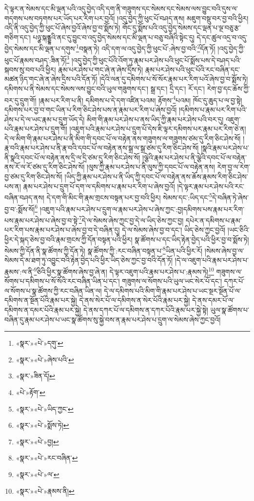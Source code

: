 དེ་ལྟར་ན་སེམས་དང་མི་ལྡན་པའི་འདུ་བྱེད་འདི་དག་ནི་གཟུགས་དང་སེམས་དང་སེམས་ལས་བྱུང་བའི་དུས་ལ་གདགས་པས་བཏགས་པར་ཡོད་པར་རིག་པར་བྱའོ། །འདུ་བྱེད་ཀྱི་ཕུང་པོ་བཤད་ནས། མཇུག་བསྡུ་བར་བྱ་བའི་ཕྱིར། འདི་ནི་འདུ་བྱེད་ཀྱི་ཕུང་པོ་ཞེས་བྱའོ་ཞེས་བྱ་བ་སྨོས་ཏེ། གོང་དུ་སྨོས་པའི་འདུ་བྱེད་སེམས་དང་ལྡན་པ་ལྔ་བཅུ་རྩ་གཅིག་དང་། པཉྩ་སྐནྡྷའི་ནང་དུ་བྱུང་བ་འདུ་བྱེད་སེམས་དང་མི་ལྡན་པ་བཅུ་བཞིའི་སྟེང་དུ། དེ་དང་ཚུལ་འདྲ་བ་འདུ་བྱེད་སེམས་དང་མི་ལྡན་པ་དགུས་\footnote{«སྣར་»«པེ་»དགུ་}བསྣན་ཏེ། འདི་དག་ལ་འདུ་བྱེད་ཀྱི་ཕུང་པོ་:ཞེས་བྱ་བའི་\footnote{«སྣར་»«པེ་»ཞེས་པའི་}དོན་ཏོ། །འདུ་བྱེད་ཀྱི་ཕུང་པོ་རྣམས་བཤད་:ཟིན་ཏོ།\footnote{«སྣར་»ཟིན་དོ།} །འདུ་བྱེད་ཀྱི་ཕུང་པོའི་འོག་ཏུ་རྣམ་པར་ཤེས་པའི་ཕུང་པོ་སྨོས་པས་དེ་བཤད་པའི་སྐབས་སུ་བབ་པའི་ཕྱིར། རྣམ་པར་ཤེས་པ་གང་ཞེ་ན་ཞེས་དྲིས་ཏེ། རྣམ་པར་ཤེས་པའི་ཕུང་པོའི་རང་བཞིན་དང་མཚན་ཉིད་གང་ཞེ་ན་ཞེས་དྲིས་པའི་དོན་ཏོ། །དེའི་ལན་དུ་དམིགས་པ་སོ་སོར་རྣམ་པར་རིག་པའོ་ཞེས་བྱ་བ་སྨོས་ཏེ། དམིགས་པ་ནི་སེམས་དང་སེམས་ལས་བྱུང་བའི་ཡུལ་གཟུགས་དང་། སྒྲ་དང་། དྲི་དང་། རོ་དང་། རེག་བྱ་དང་ཆོས་ཀྱི་བར་དུ་དྲུག་གོ། །རྣམ་པར་རིག་པ་ནི། དམིགས་པ་དེ་དག་འཛིན་པའམ། རྟོགས་\footnote{«པེ་»རྟོག་}པའམ། ཁོང་དུ་ཆུད་པ་ལ་བྱ་སྟེ། དམིགས་པར་བྱ་བ་གང་ཡིན་པ་རིག་ཅིང་ཤེས་པས་ན་རྣམ་པར་རིག་པ་ཞེས་བྱའོ། །དམིགས་པ་རྣམ་པར་རིག་པའི་ཤེས་པ་དེ་ལ་ཡང་རྣམ་པ་དྲུག་ཡོད་དེ། མིག་གི་རྣམ་པར་ཤེས་པ་ནས་ཡིད་ཀྱི་རྣམ་པར་ཤེས་པའི་བར་དུ། འཇུག་པའི་རྣམ་པར་ཤེས་པ་དྲུག་གོ། །འཇུག་པའི་རྣམ་པར་ཤེས་པ་དྲུག་པོ་དེས་ཇི་ལྟར་དམིགས་པར་རྣམ་པར་རིག་ཅེ་ན། དེ་ལ་མིག་གི་རྣམ་པར་ཤེས་པ་ནི་མིག་གི་དབང་པོ་ལ་བརྟེན་ནས་གཟུགས་ལ་གཟུགས་ཙམ་དུ་རིག་ཅིང་ཤེས་སོ། །རྣ་བའི་རྣམ་པར་ཤེས་པ་ནི་རྣ་བའི་དབང་པོ་ལ་བརྟེན་ནས་སྒྲ་ལ་སྒྲ་ཙམ་དུ་རིག་ཅིང་ཤེས་སོ། །སྣའི་རྣམ་པར་ཤེས་པ་ནི་སྣའི་དབང་པོ་ལ་བརྟེན་ནས་དྲི་ལ་དྲི་ཙམ་དུ་རིག་ཅིང་ཤེས་སོ། །ལྕེའི་རྣམ་པར་ཤེས་པ་ནི་ལྕེའི་དབང་པོ་ལ་བརྟེན་ནས་རོ་ལ་རོ་ཙམ་དུ་རིག་ཅིང་ཤེས་སོ། །ལུས་ཀྱི་རྣམ་པར་ཤེས་པ་ནི་ལུས་ཀྱི་དབང་པོ་ལ་བརྟེན་ནས། རེག་བྱ་ལ་རེག་བྱ་ཙམ་དུ་རིག་ཅིང་ཤེས་སོ། །ཡིད་ཀྱི་རྣམ་པར་ཤེས་པ་ནི་ཡིད་ཀྱི་དབང་པོ་ལ་བརྟེན་ནས་ཆོས་རྣམས་རིག་ཅིང་ཤེས་པས་ན། རྣམ་པར་ཤེས་པ་དྲུག་པོ་དག་ལ་དམིགས་པ་རྣམ་པར་རིག་པ་ཞེས་བྱའོ། །དེ་ལྟར་རྣམ་པར་ཤེས་པའི་རང་བཞིན་བཤད་ནས། དེ་དག་གི་མིང་གི་རྣམ་གྲངས་བསྟན་པར་བྱ་བའི་ཕྱིར། སེམས་དང་:ཡིད་དང་\footnote{«སྣར་»«པེ་»ཡིད་ཀྱང་}དེ་བཞིན་ཏེ་ཞེས་བྱ་བ་:སྨོས་སོ།\footnote{«སྣར་»«པེ་»སྨོས་ཏེ།} །འཇུག་པའི་རྣམ་པར་ཤེས་པ་དྲུག་ལ་རྣམ་པར་ཤེས་པ་ཞེས་ཀྱང་:བྱ།དམིགས་པས་རྣམ་པར་རིག་པས་རྣམ་པར་ཤེས་པ་ཞེས་བྱ་བ་སྟེ་\footnote{«སྣར་»«པེ་»བྱ།}དེ་ལ་སེམས་ཞེས་ཀྱང་བྱ་དེ་ལ་ཡིད་ཅེས་ཀྱང་བྱ། དཔེར་ན་དམིགས་པ་རྣམ་པར་རིག་པས་རྣམ་པར་ཤེས་པ་ཞེས་བྱ་བ་དེ་བཞིན་དུ། དེ་ལ་སེམས་ཞེས་བྱ་བ་དང་། ཡིད་ཅེས་ཀྱང་བྱའོ། །ཡང་ཅིའི་ཕྱིར་དེ་སྐད་ཅེས་བྱ་བའི་རྣམ་གྲངས་ཀྱི་དོན་བསྟན་པའི་ཕྱིར། སྣ་ཚོགས་པ་དང་ཡིད་རྟེན་བྱེད་པའི་ཕྱིར་བྱ་བ་སྨོས་ཏེ། སེམས་ཀྱི་དོན་ནི་སྣ་ཚོགས་ཀྱི་དོན་ཏེ། སྣ་ཚོགས་ཀྱི་:རང་བཞིན་བསྟན་པ་\footnote{«སྣར་»«པེ་»རང་བཞིན་}ཡིན་པའི་ཕྱིར་རོ། །སེམས་ཞེས་བྱ་ལ་སེམས་དེ་མ་ཐག་ཏུ་འབྱུང་བའི་རྟེན་བྱེད་པའི་ཕྱིར་ཡིད་ཅེས་ཀྱང་བྱ་བའི་དོན་ཏོ། །དེ་ལ་འཇུག་པའི་རྣམ་པར་ཤེས་པ་རྣམས་:ལ་ནི་\footnote{«སྣར་»«པེ་»ལ་}ཅིའི་ཕྱིར་སྣ་ཚོགས་ཞེས་བྱ་ཞེ་ན། དེ་ལྟར་འཇུག་པའི་རྣམ་པར་ཤེས་པ་:རྣམས་ཏེ།\footnote{«སྣར་»«པེ་»རྣམས་ནི།} གཟུགས་ལ་སོགས་པ་དམིགས་པ་སོ་སོའི་རང་བཞིན་ཡིན་པ་དང་། གཟུགས་ལ་སོགས་པའི་ཡུལ་ཡང་སེར་པོ་དང་། དཀར་པོ་ལ་སོགས་པ་སྣ་ཚོགས་ཀྱི་རང་བཞིན་ཡིན་ལ། དེ་ལ་དམིགས་པའི་མིག་གི་རྣམ་པར་ཤེས་པ་ཡང་སྔར་སྔོན་པོ་ལ་དམིགས་ན་སྔོན་པོའི་རྣམ་པར་སྐྱེ། དེ་ནས་སེར་པོ་ལ་དམིགས་ན་སེར་པོའི་རྣམ་པར་སྐྱེ། དེ་ནས་དམར་པོ་ལ་དམིགས་ན་དམར་པོའི་རྣམ་པར་སྐྱེ། དེ་ནས་དཀར་པོ་ལ་དམིགས་ན་དཀར་པོའི་རྣམ་པར་སྐྱེ་སྟེ། ཡུལ་སྣ་ཚོགས་པ་བཞིན་དུ་རྣམ་པར་ཤེས་པ་ཡང་སྣ་ཚོགས་སུ་སྐྱེ་བས་ན་རྣམ་པར་ཤེས་པ་དྲུག་ལ་སེམས་ཞེས་ཀྱང་བྱའོ། 